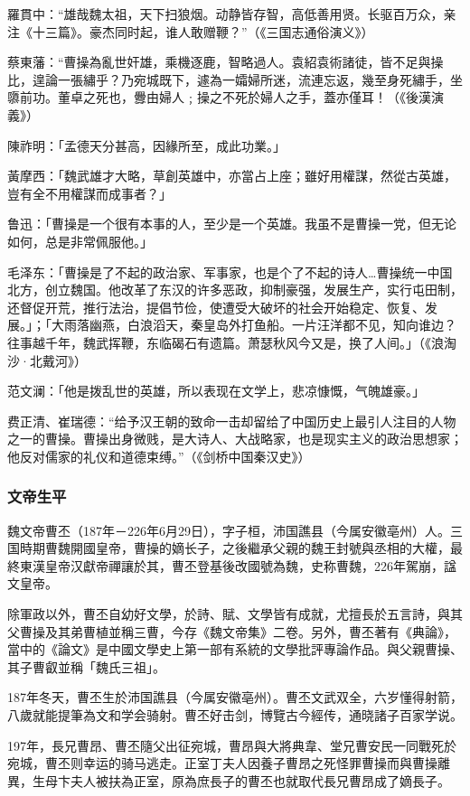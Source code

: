 羅貫中：“雄哉魏太祖，天下扫狼烟。动静皆存智，高低善用贤。长驱百万众，亲注《十三篇》。豪杰同时起，谁人敢赠鞭？”（《三国志通俗演义》）

蔡東藩：“曹操為亂世奸雄，乘機逐鹿，智略過人。袁紹袁術諸徒，皆不足與操比，遑論一張繡乎？乃宛城既下，遽為一孀婦所迷，流連忘返，幾至身死繡手，坐隳前功。董卓之死也，釁由婦人﹔操之不死於婦人之手，蓋亦僅耳！（《後漢演義》）

陳祚明：「孟德天分甚高，因緣所至，成此功業。」

黃摩西：「魏武雄才大略，草創英雄中，亦當占上座；雖好用權謀，然從古英雄，豈有全不用權謀而成事者？」

鲁迅：「曹操是一个很有本事的人，至少是一个英雄。我虽不是曹操一党，但无论如何，总是非常佩服他。」

毛泽东：「曹操是了不起的政治家、军事家，也是个了不起的诗人…曹操统一中国北方，创立魏国。他改革了东汉的许多恶政，抑制豪强，发展生产，实行屯田制，还督促开荒，推行法治，提倡节俭，使遭受大破坏的社会开始稳定、恢复、发展。」；「大雨落幽燕，白浪滔天，秦皇岛外打鱼船。一片汪洋都不见，知向谁边？往事越千年，魏武挥鞭，东临碣石有遗篇。萧瑟秋风今又是，换了人间。」（《浪淘沙·北戴河》）

范文澜：「他是拨乱世的英雄，所以表现在文学上，悲凉慷慨，气魄雄豪。」

费正清、崔瑞德：“给予汉王朝的致命一击却留给了中国历史上最引人注目的人物之一的曹操。曹操出身微贱，是大诗人、大战略家，也是现实主义的政治思想家；他反对儒家的礼仪和道德束缚。”（《剑桥中国秦汉史》）

\subsubsection{文帝生平}

魏文帝曹丕（187年－226年6月29日），字子桓，沛国譙县（今属安徽亳州）人。三国時期曹魏開國皇帝，曹操的嫡长子，之後繼承父親的魏王封號與丞相的大權，最終東漢皇帝汉獻帝禪讓於其，曹丕登基後改國號為魏，史称曹魏，226年駕崩，諡文皇帝。

除軍政以外，曹丕自幼好文學，於詩、賦、文學皆有成就，尤擅長於五言詩，與其父曹操及其弟曹植並稱三曹，今存《魏文帝集》二卷。另外，曹丕著有《典論》，當中的《論文》是中國文學史上第一部有系統的文學批評專論作品。與父親曹操、其子曹叡並稱「魏氏三祖」。

187年冬天，曹丕生於沛国譙县（今属安徽亳州）。曹丕文武双全，六岁懂得射箭，八歲就能提筆為文和学会骑射。曹丕好击剑，博覽古今經传，通晓諸子百家学说。

197年，長兄曹昂、曹丕隨父出征宛城，曹昂與大將典韋、堂兄曹安民一同戰死於宛城，曹丕则幸运的骑马逃走。正室丁夫人因養子曹昂之死怪罪曹操而與曹操離異，生母卞夫人被扶為正室，原為庶長子的曹丕也就取代長兄曹昂成了嫡長子。

